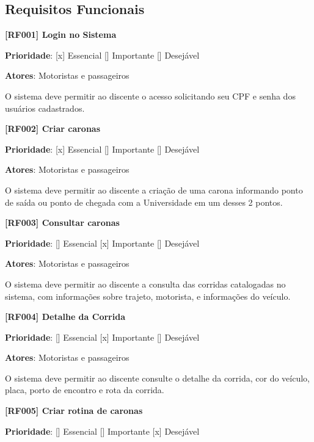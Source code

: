 





\subsection{Requisitos Funcionais}
\textbf{[RF001] Login no Sistema}

\textbf{Prioridade}:      [x] Essencial        [] Importante     [] Desejável 

\textbf{Atores}: Motoristas e passageiros


O sistema deve permitir ao discente o acesso solicitando seu CPF e senha dos usuários cadastrados.

\textbf{[RF002] Criar caronas}

\textbf{Prioridade}:      [x] Essencial        [] Importante     [] Desejável 

\textbf{Atores}: Motoristas e passageiros

O sistema deve permitir ao discente a criação de uma carona informando ponto de saída ou ponto de chegada com a Universidade em um desses 2 pontos.

\textbf{[RF003] Consultar caronas}

\textbf{Prioridade}:      [] Essencial        [x] Importante     [] Desejável 

\textbf{Atores}: Motoristas e passageiros

O sistema deve permitir ao discente a consulta das corridas catalogadas no sistema, com informações sobre trajeto, motorista, e informações do veículo.

\textbf{[RF004] Detalhe da Corrida}

\textbf{Prioridade}:      [] Essencial        [x] Importante     [] Desejável 

\textbf{Atores}: Motoristas e passageiros

O sistema deve permitir ao discente consulte o detalhe da corrida, cor do veículo, placa, porto de encontro e rota da corrida.

\textbf{[RF005] Criar rotina de caronas}

\textbf{Prioridade}:      [] Essencial        [] Importante     [x] Desejável 

